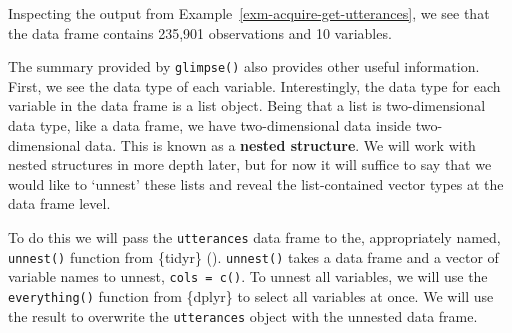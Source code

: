\documentclass[
  letterpaper,
  krantz1]{latex/krantz-mod}
\theoremstyle{definition}
\theoremstyle{definition}
\theoremstyle{remark}
\begin{document}
Inspecting the output from Example~\ref{exm-acquire-get-utterances}, we
see that the data frame contains 235,901 observations and 10 variables.

The summary provided by \texttt{glimpse()} also provides other useful
information. First, we see the data type of each variable.
Interestingly, the data type for each variable in the data frame is a
list object. Being that a list is two-dimensional data type, like a data
frame, we have two-dimensional data inside two-dimensional data. This is
known as a \textbf{nested structure}. We will
work with nested structures in more depth later, but for now it will
suffice to say that we would like to `unnest' these lists and reveal the
list-contained vector types at the data frame level.

To do this we will pass the \texttt{utterances} data frame to the,
appropriately named, \texttt{unnest()} function from \{tidyr\}
().
\texttt{unnest()} takes a data frame and a vector of variable names to
unnest, \texttt{cols\ =\ c()}. To unnest all variables, we will use the
\texttt{everything()} function from \{dplyr\} to select all variables at
once. We will use the result to overwrite the \texttt{utterances} object
with the unnested data frame.
\end{document}
